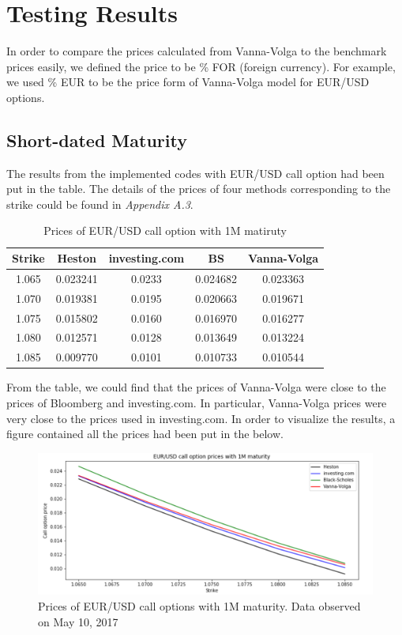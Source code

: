 \section{Testing Results}
In order to compare the prices calculated from Vanna-Volga to the benchmark prices easily, we defined the price to be \% FOR (foreign currency). For example, we used \% EUR to be the price form of Vanna-Volga model for EUR/USD options.
\subsection{Short-dated Maturity}
The results from the implemented codes with EUR/USD call option had been put in the table. The details of the prices of four methods corresponding to the strike could be found in \textit{Appendix A.3}.

\begin{table}[htb]
\centering
\caption{Prices of EUR/USD call option with 1M matiruty}
\begin{tabular}{ccccc}
\hline \hline
Strike & Heston & investing.com & BS & Vanna-Volga \\ [0.5ex]
\hline
1.065 &	0.023241&	0.0233	&0.024682&	0.023363 \\ 
1.070&	0.019381&	0.0195&	0.020663&	0.019671\\
1.075	&0.015802&	0.0160&	0.016970&	0.016277 \\
1.080	&0.012571&	0.0128&	0.013649&	0.013224\\
1.085	&0.009770&	0.0101&	0.010733&	0.010544 \\ [0.5ex]
\hline
\end{tabular}
\label{table:prices-1M}
\end{table}

\noindent
From the table, we could find that the prices of Vanna-Volga were close to the prices of Bloomberg and investing.com. In particular, Vanna-Volga prices were very close to the prices used in investing.com. In order to visualize the results, a figure contained all the prices had been put in the below.

\begin{figure}[htb]
	\centering
\includegraphics[scale=0.4]{./Testing-data/Python-codes/Python-4prices-1M.png} 
\caption{Prices of EUR/USD call options with 1M maturity. Data observed on May 10, 2017}
\label{fig:prices-label} %
\end{figure}

